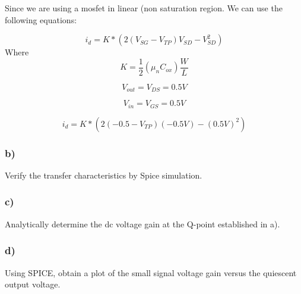 \documentclass[10pt,a4paper]{article}
\begin{document}
Since we are using a mosfet in linear (non saturation region. We can use the following equations:

\begin{equation}
i_{d} = K * (2(V_{SG} - V_{TP}) V_{SD} - V_{SD}^2)
\end{equation}
Where
\begin{equation}
K =\frac{1}{2}(\mu_n C_{ox})\frac{W}{L}
\end{equation}


\begin{equation}
V_{out} = V_{DS}  = 0.5 V
\end{equation}

\begin{equation}
V_{in} = V_{GS} = 0.5 V
\end{equation}


\begin{equation}
i_{d} = K * (2(-0.5 - V_{TP})(-0.5V) - (0.5V)^2)
\end{equation}


\subsubsection*{b)}
Verify the transfer characteristics by Spice simulation.

\subsubsection*{c)}
Analytically determine the dc voltage gain at the Q-point established in a).

\subsubsection*{d)}
Using SPICE, obtain a plot of the small signal voltage gain versus the
quiescent output voltage.
\end{document}
